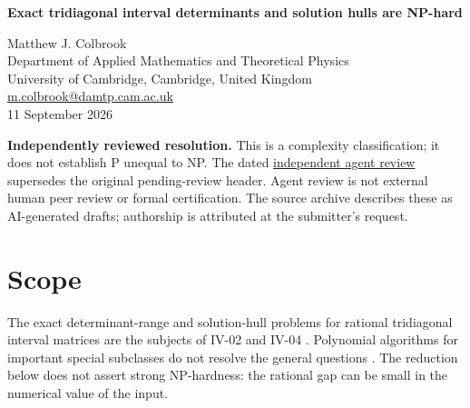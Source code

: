 \documentclass[11pt,a4paper]{article}
\theoremstyle{remark}\newtheorem{remark}[theorem]{Remark}
\newcommand{\header}[2]{\begin{center}{\Large\bfseries #1\par}\vspace{6pt}{\small #2\par}\end{center}\vspace{6pt}}
\begin{document}
\header{Exact tridiagonal interval determinants and solution hulls are NP-hard}{Repository IV-02 and IV-04. Claimed resolutions; independent review pending.}
\begin{center}Matthew J. Colbrook\\{\small Department of Applied Mathematics and Theoretical Physics\\University of Cambridge, Cambridge, United Kingdom\\\href{mailto:m.colbrook@damtp.cam.ac.uk}{m.colbrook@damtp.cam.ac.uk}}\\11 September 2026\end{center}
\textbf{Independently reviewed resolution.} This is a complexity classification; it does not establish P unequal to NP.
The dated \href{https://github.com/MColbrook/OpenProblemsInNLA/blob/codex/colbrook-package-submissions/references/colbrook-intervals-2026-09-11/verification/reviews/IV-02_IV-04-review.md}{independent agent review} supersedes the original pending-review header. Agent review is not external human peer review or formal certification. The source archive describes these as AI-generated drafts; authorship is attributed at the submitter's request.
\par\medskip
\begin{abstract}
A reduction from PARTITION encodes signed sums of small rational rotation angles in the continuant of a tridiagonal interval matrix. It proves NP-completeness of the upper determinant threshold problem, and NP-hardness of exact determinant-range and exact solution-hull computation. The reduction uses independent interval entries, fixed superdiagonal entries equal to 1, and an everywhere nonsingular interval family. For the hull result the right-hand side is the single point $-e_n$. General exact-output upper bounds are also recorded, so each requested polynomial-time existence question is equivalent to $\mathsf P=\mathsf{NP}$.
\end{abstract}
\section{Scope}
The exact determinant-range and solution-hull problems for rational tridiagonal interval matrices are the subjects of IV-02 and IV-04 \cite{repo2,repo4}. Polynomial algorithms for important special subclasses do not resolve the general questions \cite{det,overview,complexity}. The reduction below does not assert strong NP-hardness: the rational gap can be small in the numerical value of the input.
\end{document}
